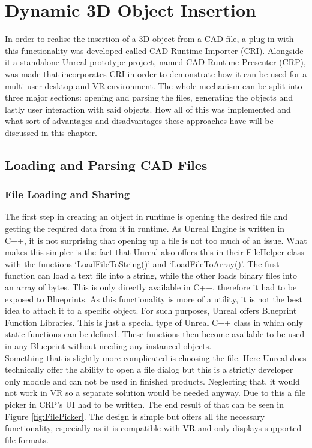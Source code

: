\chapter{Dynamic 3D Object Insertion}\label{chp:ObjectLoading}

In order to realise the insertion of a 3D object from a \acs{CAD} file, a plug-in with this functionality was developed called CAD Runtime Importer (\acs{CRI}). Alongside it a standalone Unreal prototype project, named CAD Runtime Presenter (\acs{CRP}), was made that incorporates \acs{CRI} in order to demonstrate how it can be used for a multi-user desktop and VR environment. The whole mechanism can be split into three major sections: opening and parsing the files, generating the objects and lastly user interaction with said objects. How all of this was implemented and what sort of advantages and disadvantages these approaches have will be discussed in this chapter.
\section{Loading and Parsing CAD Files}
\subsection{File Loading and Sharing}
The first step in creating an object in runtime is opening the desired file and getting the required data from it in runtime. As Unreal Engine is written in C++, it is not surprising that opening up a file is not too much of an issue. What makes this simpler is the fact that Unreal also offers this in their FileHelper class with the functions `LoadFileToString()' and `LoadFileToArray()'. The first function can load a text file into a string, while the other loads binary files into an array of bytes. This is only directly available in C++, therefore it had to be exposed to Blueprints. As this functionality is more of a utility, it is not the best idea to attach it to a specific object. For such purposes, Unreal offers Blueprint Function Libraries\cite{bib:UEBFL}. This is just a special type of Unreal C++ class in which only static functions can be defined. These functions then become available to be used in any Blueprint without needing any instanced objects.\\
Something that is slightly more complicated is choosing the file. Here Unreal does technically offer the ability to open a file dialog but this is a strictly developer only module and can not be used in finished products\cite{bib:DeskPlat}. Neglecting that, it would not work in VR so a separate solution would be needed anyway. Due to this a file picker in CRP's UI had to be written. The end result of that can be seen in Figure \ref{fig:FilePicker}. The design is simple but offers all the necessary functionality, especially as it is compatible with VR and only displays supported file formats.\\

